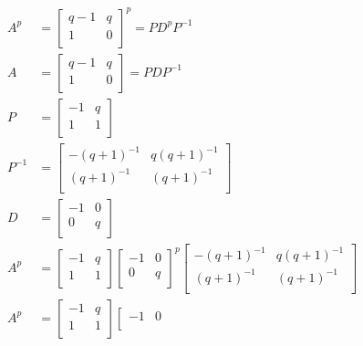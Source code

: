 \documentclass[paper.tex]{subfiles}
\begin{document}
\begin{align*}
A^{p} &=
\left[ \begin{array}{ccc}
q-1 & q \\
1 & 0 \\
\end{array} \right] ^{p}
=
PD^{p}P^{-1} \\
A &=
\left[ \begin{array}{ccc}
q-1 & q \\
1 & 0 \\
\end{array} \right]
=
PDP^{-1} \\
P &=
\left[ \begin{array}{ccc}
-1 & q \\
1 & 1 \\
\end{array} \right] \\
P^{-1} &=
\left[ \begin{array}{ccc}
-(q+1)^{-1} & q(q+1)^{-1} \\
(q+1)^{-1} & (q+1)^{-1} \\
\end{array} \right] \\
D &=
\left[ \begin{array}{ccc}
-1 & 0 \\
0 & q \\
\end{array} \right] \\
A^{p}
&=
\left[ \begin{array}{ccc}
-1 & q \\
1 & 1 \\
\end{array} \right]
\left[ \begin{array}{ccc}
-1 & 0 \\
0 & q \\
\end{array} \right] ^{p}
\left[ \begin{array}{ccc}
-(q+1)^{-1} & q(q+1)^{-1} \\
(q+1)^{-1} & (q+1)^{-1} \\
\end{array} \right] \\
A^{p}
&=
\left[ \begin{array}{ccc}
-1 & q \\
1 & 1 \\
\end{array} \right]
\left[ \begin{array}{ccc}
-1 & 0 \\

\end{array}
\end{align*}
\end{document}
